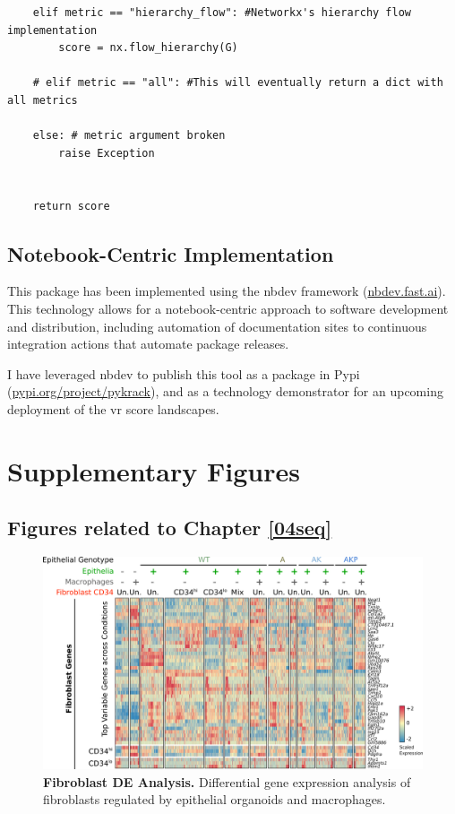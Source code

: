 \begin{lstlisting}
    elif metric == "hierarchy_flow": #Networkx's hierarchy flow implementation
        score = nx.flow_hierarchy(G)

    # elif metric == "all": #This will eventually return a dict with all metrics

    else: # metric argument broken
        raise Exception


    return score

\end{lstlisting}

\section{Notebook-Centric Implementation}

This package has been implemented using the nbdev framework (\url{nbdev.fast.ai}). This technology allows for a notebook-centric approach to software development and distribution, including automation of documentation sites to continuous integration actions that automate package releases.

I have leveraged nbdev to publish this tool as a package in Pypi (\url{pypi.org/project/pykrack}), and as a technology demonstrator for an upcoming deployment of the \acrshort{vr} score landscapes.



\chapter{Supplementary Figures}
\label{appendix:SupFig}

\section{Figures related to Chapter \ref{04seq}}

\begin{figure}[h!]
    \centering
    \includegraphics{0Xappendices/0XSup_DEfib.png}
    \caption{\textbf{Fibroblast DE Analysis.} Differential gene expression analysis of fibroblasts regulated by epithelial organoids and macrophages.}
    \label{fig:defib}
\end{figure}

